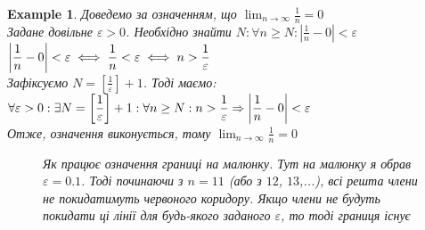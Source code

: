 \documentclass[a4paper, 14pt]{extarticle}
\def\huge{\displaystyle}
\theoremstyle{theoremdd}
\theoremstyle{theoremdd}
\theoremstyle{theoremdd}
\theoremstyle{theoremdd}
\newtheorem{example}[theorem]{Example}
\theoremstyle{theoremdd}
\theoremstyle{theoremdd}
\theoremstyle{theoremdd}
\theoremstyle{theoremdd}
\begin{document}
	\begin{example}
	Доведемо за означенням, що $\displaystyle\lim_{n \to \infty} \frac{1}{n} = 0$\\
	Задане довільне $\varepsilon > 0$. Необхідно знайти $\displaystyle N: \forall n \geq N: \left|\frac{1}{n}-0 \right|<\varepsilon$\\
	$\huge \abs{\frac{1}{n} - 0} < \varepsilon \iff \displaystyle \frac{1}{n}<\varepsilon \iff n > \frac{1}{\varepsilon}$\\
	Зафіксуємо $\displaystyle N = \left[\frac{1}{\varepsilon} \right] + 1$. Тоді маємо:\\
	$\forall \varepsilon > 0: \exists N = \huge \left[\frac{1}{\varepsilon} \right] + 1: \forall n \geq N: n > \frac{1}{\varepsilon} \Rightarrow \abs{\frac{1}{n} - 0} < \varepsilon$\\
	Отже, означення виконується, тому $\displaystyle\lim_{n \to \infty} \frac{1}{n} = 0$\\
	\begin{figure}[H]
\centering
\resizebox{0.8\textwidth}{!} {
}
\caption*{Як працює означення границі на малюнку. Тут на малюнку я обрав $\varepsilon = 0.1$. Тоді починаючи з $n=11$ (або з $12$, $13$,...), всі решта члени не покидатимуть червоного коридору.
Якщо члени не будуть покидати ці лінії для будь-якого заданого $\varepsilon$, то тоді границя існує}
\end{figure}
\end{example}
\end{document}
